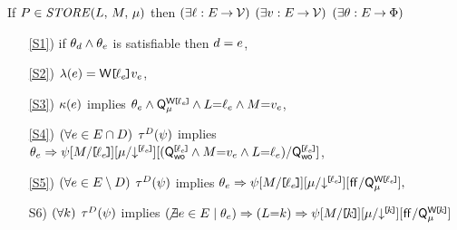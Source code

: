 \renewcommand{\cEvs}{D}
\renewcommand{\dEvs}{D}
\noindent
If $\aPS \in \sSTORE[\amode]{\cExp}{\aExp}$ then
$(\exists\ell:E\mathbin\rightarrow\mathcal{V})$
$(\exists v:E\mathbin\rightarrow\mathcal{V})$
$(\exists\theta:E\mathbin\rightarrow\Phi)$
\begin{enumerate}
\item[\ref{S1})] if $\theta_d\land\theta_e$ is satisfiable then $d=e$,
\item[\ref{S2})] $\labelingAct(\aEv) = \DWREF{\cVal_\aEv}{\aVal_\aEv}$,
\item[\ref{S3})] 
  $\kappa(e)$ implies
  \begin{math}
    \theta_e
    \land \smash{\mathsf{Q}_{\mu}^{\mathsf{W}\mkern-2mu\texttt{[}\mkern-2mu\ell_e \mkern-2mu\texttt{]}\mkern-2mu}}
    \land L{=}\ell_e
    \land M{=}v_e
  \end{math},
\item[\ref{S4})]
  \begin{math}
    (\forall e\in E\cap D)
  \end{math}
  $\aTr{\bEvs}{\bForm}$ implies 
  \begin{math}
    \theta_e
    \Rightarrow {
      \psi[M/\mkern-2mu\texttt{[}\mkern-2mu\ell_e\mkern-2mu\texttt{]}\mkern-2mu]
      {[}{\mu}/\mathord{\downarrow^{\mkern-2mu\texttt{[}\mkern-2mu\ell_e\mkern-2mu\texttt{]}\mkern-2mu}}{]}
      [(\mathsf{Q}_{\mathsf{wo}}^{\mkern-2mu\texttt{[}\mkern-2mu\ell_e\mkern-2mu\texttt{]}\mkern-2mu}\land M{=}v_e\land L{=}\ell_e)/\mathsf{Q}_{\mathsf{wo}}^{\mkern-2mu\texttt{[}\mkern-2mu\ell_e\mkern-2mu\texttt{]}\mkern-2mu}]
    }
  \end{math},
\item[\ref{S5})] 
  \begin{math}    
    (\forall\aEv\in\aEvs\setminus\cEvs)
  \end{math}
  $\aTr{\cEvs}{\bForm}$ implies
  \begin{math}
    \theta_e
    \Rightarrow {
      \psi[M/\mkern-2mu\texttt{[}\mkern-2mu\ell_e\mkern-2mu\texttt{]}\mkern-2mu]
      {[}{\mu}/\mathord{\downarrow^{\mkern-2mu\texttt{[}\mkern-2mu\ell_e\mkern-2mu\texttt{]}\mkern-2mu}}{]}
      [\mkern.6mu\mathsf{ff}\mkern.6mu/\smash{\mathsf{Q}_{\mu}^{\mathsf{W}\mkern-2mu\texttt{[}\mkern-2mu\ell_e\mkern-2mu\texttt{]}\mkern-2mu}}]
    },
  \end{math}
\item[S6)]%
  \begin{math}
    (\forall k)
  \end{math}
  $\aTr{\dEvs}{\bForm}$ implies
  \begin{math}
    (\!\not\exists e\in E \mid \theta_e)
    \Rightarrow (L{=}k)
    \Rightarrow {
      \psi[M/\mkern-2mu\texttt{[}\mkern-2muk\mkern-2mu\texttt{]}\mkern-2mu]
      {[}{\mu}/\mathord{\downarrow^{\mkern-2mu\texttt{[}\mkern-2muk\mkern-2mu\texttt{]}\mkern-2mu}}{]}
      [\mkern.6mu\mathsf{ff}\mkern.6mu/\smash{\mathsf{Q}_{\mu}^{\mathsf{W}\mkern-2mu\texttt{[}\mkern-2muk\mkern-2mu\texttt{]}\mkern-2mu}}]
}
\end{math}
\end{enumerate}
